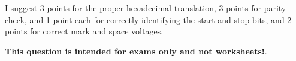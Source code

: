 I suggest 3 points for the proper hexadecimal translation, 3 points for parity check, and 1 point each for correctly identifying the start and stop bits, and 2 points for correct mark and space voltages.







{\bf This question is intended for exams only and not worksheets!}.



